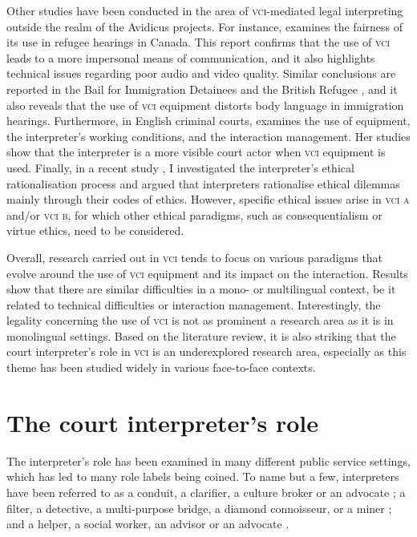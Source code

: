 \documentclass[output=paper]{langsci/langscibook}
\begin{document}
Other studies have been conducted in the area of \textsc{vci}-mediated legal interpreting outside the realm of the Avidicus projects. For instance, \citet{Ellis2004} examines the fairness of its use in refugee hearings in Canada. This report confirms that the use of \textsc{vci} leads to a more impersonal means of communication, and it also highlights technical issues regarding poor audio and video quality. Similar conclusions are reported in the Bail for Immigration Detainees and the British Refugee , and it also reveals that the use of \textsc{vci} equipment distorts body language in immigration hearings. Furthermore, in English criminal courts, \citet{Fowler2012} examines the use of equipment, the interpreter’s working conditions, and the interaction management. Her studies show that the interpreter is a more visible court actor when \textsc{vci} equipment is used. Finally, in a recent study \citet{Devaux2017a}, I investigated the interpreter’s ethical rationalisation process and argued that interpreters rationalise ethical dilemmas mainly through their codes of ethics. However, specific ethical issues arise in \textsc{vci a} and/or \textsc{vci b}, for which other ethical paradigms, such as consequentialism or virtue ethics, need to be considered. 

Overall, research carried out in \textsc{vci} tends to focus on various paradigms that evolve around the use of \textsc{vci} equipment and its impact on the interaction. Results show that there are similar difficulties in a mono- or multilingual context, be it related to technical difficulties or interaction management. Interestingly, the legality concerning the use of \textsc{vci} is not as prominent a research area as it is in monolingual settings. Based on the literature review, it is also striking that the court interpreter’s role in \textsc{vci} is an underexplored research area, especially as this theme has been studied widely in various face-to-face contexts. 

\section{The court interpreter’s role}
\label{sec:devaux:3}
The interpreter’s role has been examined in many different public service settings, which has led to many role labels being coined. To name but a few, interpreters have been referred to as a conduit, a clarifier, a culture broker or an advocate \citep{Niska2002}; a filter, a detective, a multi-purpose bridge, a diamond connoisseur, or a miner \citep{Angelelli2004}; and a helper, a social worker, an advisor or an advocate \citep{Grbic2011}.
\end{document}
